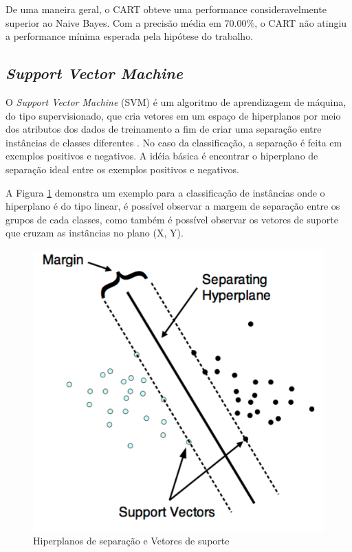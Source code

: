 De uma maneira geral, o CART obteve uma performance consideravelmente superior ao Naive Bayes. Com a precisão média em 70.00\%, o CART não atingiu a performance mínima esperada pela hipótese do trabalho.

\subsection{\textit{Support Vector Machine}}

O \textit{Support Vector Machine} (SVM) é um algoritmo de aprendizagem de máquina, do tipo supervisionado, que cria vetores em um espaço de hiperplanos por meio dos atributos dos dados de treinamento a fim de criar uma separação entre instâncias de classes diferentes \cite{rebentrost2014quantum}. No caso da classificação, a separação é feita em exemplos positivos e negativos. A idéia básica é encontrar o hiperplano de separação ideal entre os exemplos positivos e negativos.

A Figura \ref{fig:svm} demonstra um exemplo para a classificação de instâncias onde o hiperplano é do tipo linear, é possível observar a margem de separação entre os grupos de cada classes, como também é possível observar os vetores de suporte que cruzam as instâncias no plano (X, Y).

\begin{figure}[htb]
  \caption{\label{fig:svm}Hiperplanos de separação e Vetores de suporte }
  \begin{center}
    \includegraphics[scale=0.4]{imagens/svm.png}
  \end{center}
\end{figure}
\newpage


